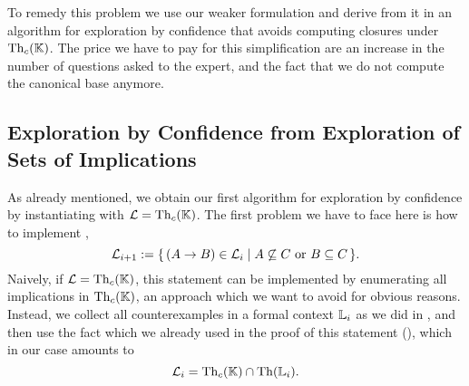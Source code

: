 To remedy this problem we use our weaker formulation
 and derive from it in
 an algorithm for exploration by confidence that avoids computing
closures under $\operatorname{Th}_{c}({\mathbb{K}})$.  The price we have to pay for this simplification are an
increase in the number of questions asked to the expert, and the fact that we do not
compute the canonical base anymore.

\subsection{Exploration by Confidence from Exploration of Sets of Implications}
\label{sec:expl-conf-1}

As already mentioned, we obtain our first algorithm for exploration by confidence by
instantiating  with $\mathcal{L} = \operatorname{Th}_{c}({\mathbb{K}})$.  The
first problem we have to face here is how to implement , \ie
\begin{equation*}
  \mathcal{L}_{i+1} := {\{\, (A \to B) \in \mathcal{L}_{i} \mid A \not\subseteq C \text{
      or } B \subseteq C \,\}}.
\end{equation*}
Naively, if $\mathcal{L} = \operatorname{Th}_{c}({\mathbb{K}})$, this statement can be implemented by
enumerating all implications in $\operatorname{Th}_{c}({\mathbb{K}})$, an approach which we want to avoid for
obvious reasons.  Instead, we collect all counterexamples in a formal context ${\mathbb{L}}_{i}$
as we did in , and then use the
fact which we already used in the proof of this statement (), which in our
case amounts to
\begin{equation*}
  \mathcal{L}_{i} = \operatorname{Th}_{c}({\mathbb{K}}) \cap \operatorname{Th}({\mathbb{L}}_{i}).
\end{equation*}


